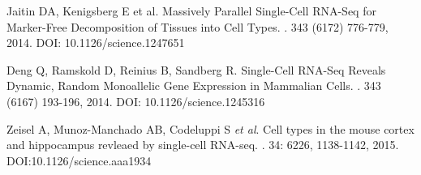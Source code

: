\documentclass[12pt]{article}\usepackage[]{graphicx}\usepackage[usenames,dvipsnames]{color}
\begin{document}
\begin{thebibliography}{1}

Jaitin DA,  Kenigsberg E et al.
\newblock Massively Parallel Single-Cell RNA-Seq for Marker-Free Decomposition of Tissues into Cell Types.
. 343 (6172) 776-779, 2014. DOI: 10.1126/science.1247651

Deng Q,  Ramskold D,  Reinius B,  Sandberg R.
\newblock Single-Cell RNA-Seq Reveals Dynamic, Random Monoallelic Gene Expression in Mammalian Cells.
.  343 (6167) 193-196, 2014. DOI: 10.1126/science.1245316

Zeisel A, Munoz-Manchado AB, Codeluppi S \textit{et al}.
\newblock Cell types in the mouse cortex and hippocampus revleaed by single-cell RNA-seq.
.  34: 6226, 1138-1142, 2015. DOI:10.1126/science.aaa1934

\end{thebibliography}
\end{document}
